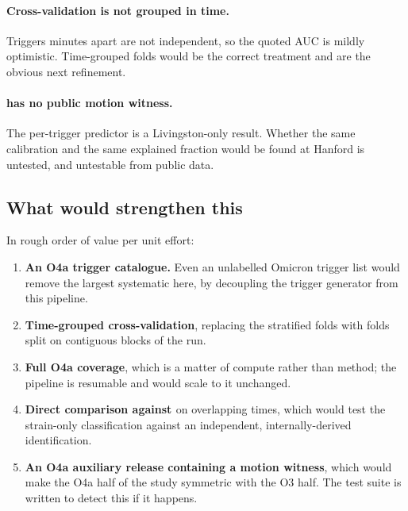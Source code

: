 \paragraph{Cross-validation is not grouped in time.} Triggers minutes apart
are not independent, so the quoted AUC is mildly optimistic. Time-grouped
folds would be the correct treatment and are the obvious next refinement.

\paragraph{\Hone{} has no public motion witness.} The per-trigger predictor is
a Livingston-only result. Whether the same calibration and the same explained
fraction would be found at Hanford is untested, and untestable from public
data.

\subsection{What would strengthen this}

In rough order of value per unit effort:

\begin{enumerate}
  \item \textbf{An O4a trigger catalogue.} Even an unlabelled Omicron trigger
        list would remove the largest systematic here, by decoupling the
        trigger generator from this pipeline.
  \item \textbf{Time-grouped cross-validation}, replacing the stratified folds
        with folds split on contiguous blocks of the run.
  \item \textbf{Full O4a coverage}, which is a matter of compute rather than
        method; the pipeline is resumable and would scale to it unchanged.
  \item \textbf{Direct comparison against \citet{Nandi2026}} on overlapping
        times, which would test the strain-only classification against an
        independent, internally-derived identification.
  \item \textbf{An O4a auxiliary release containing a motion witness}, which
        would make the O4a half of the study symmetric with the O3 half. The
        test suite is written to detect this if it happens.
\end{enumerate}
